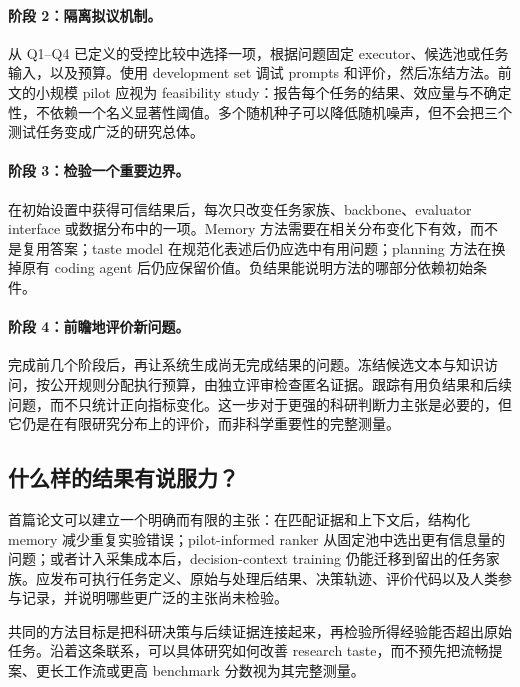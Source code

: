 \paragraph{阶段 2：隔离拟议机制。}
从 Q1--Q4 已定义的受控比较中选择一项，根据问题固定 executor、候选池或任务输入，以及预算。使用 development set 调试 prompts 和评价，然后冻结方法。前文的小规模 pilot 应视为 feasibility study：报告每个任务的结果、效应量与不确定性，不依赖一个名义显著性阈值。多个随机种子可以降低随机噪声，但不会把三个测试任务变成广泛的研究总体。

\paragraph{阶段 3：检验一个重要边界。}
在初始设置中获得可信结果后，每次只改变任务家族、backbone、evaluator interface 或数据分布中的一项。Memory 方法需要在相关分布变化下有效，而不是复用答案；taste model 在规范化表述后仍应选中有用问题；planning 方法在换掉原有 coding agent 后仍应保留价值。负结果能说明方法的哪部分依赖初始条件。

\paragraph{阶段 4：前瞻地评价新问题。}
完成前几个阶段后，再让系统生成尚无完成结果的问题。冻结候选文本与知识访问，按公开规则分配执行预算，由独立评审检查匿名证据。跟踪有用负结果和后续问题，而不只统计正向指标变化。这一步对于更强的科研判断力主张是必要的，但它仍是在有限研究分布上的评价，而非科学重要性的完整测量。

\subsection{什么样的结果有说服力？}

首篇论文可以建立一个明确而有限的主张：在匹配证据和上下文后，结构化 memory 减少重复实验错误；pilot-informed ranker 从固定池中选出更有信息量的问题；或者计入采集成本后，decision-context training 仍能迁移到留出的任务家族。应发布可执行任务定义、原始与处理后结果、决策轨迹、评价代码以及人类参与记录，并说明哪些更广泛的主张尚未检验。

共同的方法目标是把科研决策与后续证据连接起来，再检验所得经验能否超出原始任务。沿着这条联系，可以具体研究如何改善 research taste，而不预先把流畅提案、更长工作流或更高 benchmark 分数视为其完整测量。
